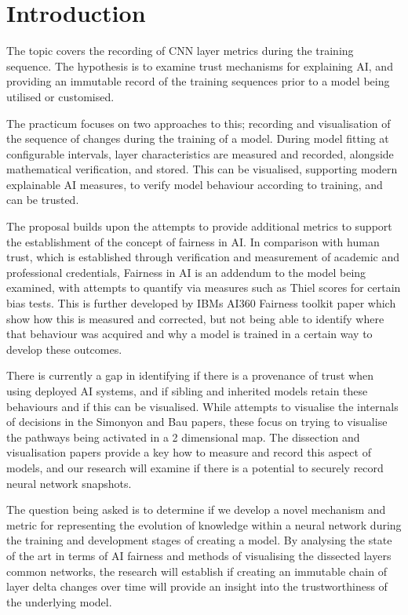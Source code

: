 \section{Introduction}

The topic covers the recording of CNN layer metrics during the training
sequence. The hypothesis is to examine trust mechanisms for explaining AI, and
providing an immutable record of the training sequences prior to a model being
utilised or customised.

The practicum focuses on two approaches to this;
recording and visualisation of the sequence of changes during the training of a
model. During model fitting at configurable intervals, layer characteristics are
measured and recorded, alongside mathematical verification, and stored. This can
be visualised, supporting modern explainable AI measures, to verify model
behaviour according to training, and can be trusted.

The proposal builds upon the attempts to provide additional metrics to support
the establishment of the concept of fairness in AI. In comparison with human
trust, which is established through verification and measurement of academic and
professional credentials, Fairness in AI is an addendum to the model being
examined, with attempts to quantify via measures such as Thiel scores for
certain bias tests. This is further developed by IBMs AI360 Fairness toolkit
paper which show how this is measured and corrected, but not being able to
identify where that behaviour was acquired and why a model is trained in a
certain way to develop these outcomes.

There is currently a gap in identifying if there is a provenance of trust when using deployed AI systems, and if sibling
and inherited models retain these behaviours and if this can be visualised.
While attempts to visualise the internals of decisions in the Simonyon and Bau
papers, these focus on trying to visualise the pathways being activated in a 2
dimensional map. The dissection and visualisation papers provide a key how to
measure and record this aspect of models, and our research will examine if there
is a potential to securely record neural network snapshots.
 
The question being asked is to determine if we develop a novel mechanism and metric for
representing the evolution of knowledge within a neural network during the
training and development stages of creating a model. By analysing the state of
the art in terms of AI fairness and methods of visualising the dissected layers
common networks, the research will establish if creating an immutable chain of
layer delta changes over time will provide an insight into the trustworthiness
of the underlying model.


